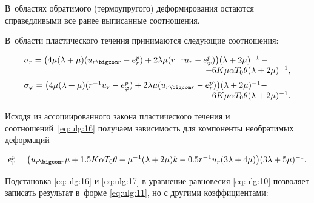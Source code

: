 В~областях обратимого (термоупругого) деформирования остаются справедливыми все ранее выписанные соотношения. 

В~области пластического течения принимаются следующие соотношения:

\begin{equation} 

\label{eq:ulg:16} 

\begin{array}{l} 

\sigma _{r} =\bigl(4\mu (\lambda +\mu ) (u_{r\bigcom r} -e_{r}^{p} )+2\lambda \mu (r^{-1} u_{r} -e_{\varphi }^{p} )\bigr) (\lambda +2\mu )^{-1} - \phantom{qqqqq}

\\

\hfill 

-6K\mu \alpha T_{0} \theta (\lambda +2\mu )^{-1} , 

\\[2mm] 

\sigma _{\varphi } = \bigl(4\mu (\lambda +\mu )(r^{-1} u_{r} -e_{\varphi }^{p} )+

2\lambda \mu (u_{r\bigcom r} -e_{r}^{p} )\bigr)

(\lambda +2\mu )^{-1} - \\

\hfill -6K\mu \alpha T_{0} \theta (\lambda +2\mu )^{-1} .

\end{array} 

\end{equation} 





Исходя из ассоциированного закона пластического течения  и соотношений~\eqref{eq:ulg:16} получаем зависимость для компоненты необратимых деформаций 

\begin{equation} 

\label{eq:ulg:17}  

e_{r}^{p} = \bigl(u_{r\bigcom r} \mu +1.5 K\alpha T_{0} \theta 

-\mu ^{-1} 

(\lambda +2\mu )k-0.5r^{-1} u_{r} (3\lambda +4\mu )\bigr)(3\lambda +5\mu )^{-1} .

\end{equation}







Подстановка \eqref{eq:ulg:16} и \eqref{eq:ulg:17} в уравнение равновесия \eqref{eq:ulg:10} позволяет записать результат в~форме \eqref{eq:ulg:11}, но с другими коэффициентами:

